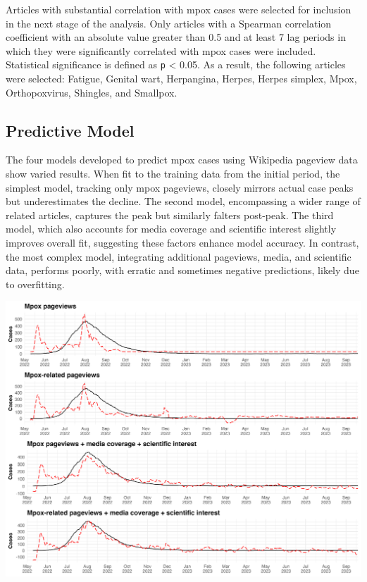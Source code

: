 \documentclass[
  12pt,
]{article}
\begin{document}
Articles with substantial correlation with mpox cases were selected for
inclusion in the next stage of the analysis. Only articles with a
Spearman correlation coefficient with an absolute value greater than 0.5
and at least 7 lag periods in which they were significantly correlated
with mpox cases were included. Statistical significance is defined as
\texttt{p} \textless{} 0.05. As a result, the following articles were
selected: Fatigue, Genital wart, Herpangina, Herpes, Herpes simplex,
Mpox, Orthopoxvirus, Shingles, and Smallpox.~

\subsection{Predictive Model}\label{predictive-model-1}

The four models developed to predict mpox cases using Wikipedia pageview
data show varied results. When fit to the training data from the initial
period, the simplest model, tracking only mpox pageviews, closely
mirrors actual case peaks but underestimates the decline. The second
model, encompassing a wider range of related articles, captures the peak
but similarly falters post-peak. The third model, which also accounts
for media coverage and scientific interest slightly improves overall
fit, suggesting these factors enhance model accuracy. In contrast, the
most complex model, integrating additional pageviews, media, and
scientific data, performs poorly, with erratic and sometimes negative
predictions, likely due to overfitting.~

\includegraphics{images/regression-analysis-model-fit-train.png}
\end{document}
